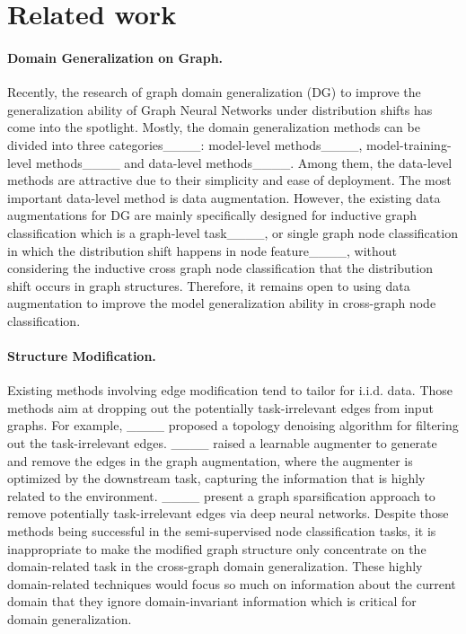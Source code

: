\section{Related work}
\paragraph{Domain Generalization on Graph.}
Recently, the research of graph domain generalization (DG) to improve the generalization ability of Graph Neural Networks under distribution shifts has come into the spotlight.
Mostly, the domain generalization methods can be divided into three categories____:
model-level methods____, model-training-level methods____ and data-level methods____. Among them, the data-level methods are attractive  due to their simplicity and ease of deployment. The most important data-level method is data augmentation.
However, the existing data augmentations for DG are mainly specifically designed for inductive graph classification which is a graph-level task____, or single graph node classification in which the distribution shift happens in node feature____, without considering the inductive cross graph node classification that the distribution shift occurs in graph structures. Therefore, it remains open to using data augmentation to improve the model generalization ability in cross-graph node classification.


\paragraph{Structure Modification.}
Existing methods involving edge modification tend to tailor for i.i.d. data. Those methods aim at dropping out the potentially
task-irrelevant edges from input graphs. For example, ____ proposed a topology denoising algorithm for filtering out the task-irrelevant edges. ____ raised a 
 learnable augmenter to generate and remove the edges in the graph augmentation, where the augmenter is  optimized by the downstream task, capturing the information that is highly related to 
the environment. ____ present a graph sparsification approach to remove potentially task-irrelevant edges via deep neural networks. Despite those methods being successful in the semi-supervised node classification tasks,
it is inappropriate to make the modified graph structure only concentrate on the domain-related task in the cross-graph domain generalization. 
These highly domain-related techniques  would focus so much on information about the current domain that they ignore domain-invariant information which is critical for domain generalization.



